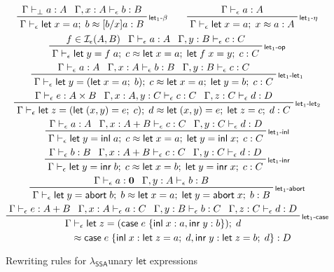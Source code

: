\documentclass[acmsmall,screen,review]{acmart}
\newcommand{\mc}[1]{\ensuremath{\mathcal{#1}}}
\newcommand{\mb}[1]{\ensuremath{\mathbf{#1}}}
\newcommand{\ms}[1]{\ensuremath{\mathsf{#1}}}
\newcommand{\lto}{:}
\newcommand{\linl}[1]{\ms{inl}\;{#1}}
\newcommand{\linr}[1]{\ms{inr}\;{#1}}
\newcommand{\labort}[1]{\ms{abort}\;{#1}}
\newcommand{\letexpr}[3]{\ensuremath{\ms{let}\;#1 = #2;\;#3}}
\newcommand{\caseexpr}[5]{\ms{case}\;#1\;\{\linl{#2} \lto #3, \linr{#4} \lto #5\}}
\newcommand{\bhyp}[2]{#1 : #2}
\newcommand{\rle}[1]{{\scriptsize\textsf{#1}}}
\newcommand{\hasty}[4]{#1 \vdash_{#2} #3: {#4}}
\newcommand{\isop}[4]{#1 \in \mc{I}_{#4}(#2, #3)}
\newcommand{\teqv}{\approx}
\newcommand{\tmeq}[5]{#1 \vdash_{#2} #3 \teqv #4 : {#5}}
\newcommand{\isotopessa}{\(\lambda_{\ms{SSA}}\)}
\begin{document}
\begin{figure}
  \begin{gather*}
    \prftree[r]{\rle{let$_1$-$\beta$}}
      {\hasty{\Gamma}{\bot}{a}{A}}
      {\hasty{\Gamma, \bhyp{x}{A}}{\epsilon}{b}{B}}
      {\tmeq{\Gamma}{\epsilon}{\letexpr{x}{a}{b}}{[b/x]a}{B}}
    \qquad
    \prftree[r]{\rle{let$_1$-$\eta$}}
      {\hasty{\Gamma}{\epsilon}{a}{A}}
      {\tmeq{\Gamma}{\epsilon}{\letexpr{x}{a}{x}}{a}{A}} 
    \\
    \prftree[r]{\rle{let$_1$-op}}
      {\isop{f}{A}{B}{\epsilon}}
      {\hasty{\Gamma}{\epsilon}{a}{A}}
      {\hasty{\Gamma, \bhyp{y}{B}}{\epsilon}{c}{C}}
      {\tmeq{\Gamma}{\epsilon}{\letexpr{y}{f\;a}{c}}{\letexpr{x}{a}{\letexpr{f\;x}{y}{c}}}{C}}
    \\
    \prftree[r]{\rle{let$_1$-let$_1$}}
      {\hasty{\Gamma}{\epsilon}{a}{A}}
      {\hasty{\Gamma, \bhyp{x}{A}}{\epsilon}{b}{B}}
      {\hasty{\Gamma, \bhyp{y}{B}}{\epsilon}{c}{C}}
      {\tmeq{\Gamma}{\epsilon}
        {\letexpr{y}{(\letexpr{x}{a}{b})}{c}}
        {\letexpr{x}{a}{\letexpr{y}{b}{c}}}{C}}
    \\
    \prftree[r]{\rle{let$_1$-let$_2$}}
      {\hasty{\Gamma}{\epsilon}{e}{A \times B}}
      {\hasty{\Gamma, \bhyp{x}{A}, \bhyp{y}{C}}{\epsilon}{c}{C}}
      {\hasty{\Gamma, \bhyp{z}{C}}{\epsilon}{d}{D}}
      {\tmeq{\Gamma}{\epsilon}
        {\letexpr{z}{(\letexpr{(x, y)}{e}{c})}{d}}
        {\letexpr{(x, y)}{e}{\letexpr{z}{c}{d}}}{C}}
    \\
    \prftree[r]{\rle{let$_1$-inl}}
      {\hasty{\Gamma}{\epsilon}{a}{A}}
      {\hasty{\Gamma, \bhyp{x}{A + B}}{\epsilon}{c}{C}}
      {\hasty{\Gamma, \bhyp{y}{C}}{\epsilon}{d}{D}}
      {\tmeq{\Gamma}{\epsilon}{\letexpr{y}{\linl{a}}{c}}{\letexpr{x}{a}{\letexpr{y}{\linl{x}}{c}}}{C}}
    \\
    \prftree[r]{\rle{let$_1$-inr}}
      {\hasty{\Gamma}{\epsilon}{b}{B}}
      {\hasty{\Gamma, \bhyp{x}{A + B}}{\epsilon}{c}{C}}
      {\hasty{\Gamma, \bhyp{y}{C}}{\epsilon}{d}{D}}
      {\tmeq{\Gamma}{\epsilon}{\letexpr{y}{\linr{b}}{c}}{\letexpr{x}{b}{\letexpr{y}{\linr{x}}{c}}}{C}}
    \\
    \prftree[r]{\rle{let$_1$-abort}}
      {\hasty{\Gamma}{\epsilon}{a}{\mb{0}}}
      {\hasty{\Gamma, \bhyp{y}{A}}{\epsilon}{b}{B}}
      {\tmeq{\Gamma}{\epsilon}
        {\letexpr{y}{\labort{b}}{b}}
        {\letexpr{x}{a}{\letexpr{y}{\labort{x}}{b}}}{B}}
    \\
    \prftree[r]{\rle{let$_1$-case}}
      {\hasty{\Gamma}{\epsilon}{e}{A + B}}
      {\hasty{\Gamma, \bhyp{x}{A}}{\epsilon}{a}{C}}
      {\hasty{\Gamma, \bhyp{y}{B}}{\epsilon}{b}{C}}
      {\hasty{\Gamma, \bhyp{z}{C}}{\epsilon}{d}{D}}
      { 
        \prfStackPremises
        {\Gamma \vdash_\epsilon \letexpr{z}{(\caseexpr{e}{x}{a}{y}{b})}{d}}
        {\hspace{6em} \teqv \caseexpr{e}{x}{\letexpr{z}{a}{d}}{y}{\letexpr{z}{b}{d}} : D}
      }
  \end{gather*}
  \Description{}
  \caption{Rewriting rules for \isotopessa unary \ms{let} expressions}
  \label{fig:ssa-unary-let-expr}
\end{figure}
\end{document}
